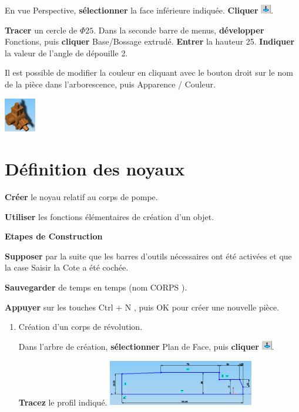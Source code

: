 En vue Perspective, \textbf{sélectionner} la face inférieure indiquée. \textbf{Cliquer} \includegraphics[height=0.4cm]{img/SW-016.png}.
  
\textbf{Tracer} un cercle de $\Phi 25$. 
Dans la seconde barre de menus, \textbf{développer} Fonctions, puis \textbf{cliquer} Base/Bossage extrudé. 
\textbf{Entrer} la hauteur 25. \textbf{Indiquer} la valeur de l'angle de dépouille 2\textdegree. 

 \begin{minipage}{0.7\linewidth}
  Il est possible de modifier la couleur en cliquant avec le bouton droit sur le nom de la pièce dans l'arborescence, puis Apparence / Couleur. 
 \end{minipage}
 \hfill
 \begin{minipage}{0.29\linewidth}
  \centering\centering\includegraphics[height=1.5cm]{img/SW-017.png}
 \end{minipage}

\newpage

\section{Définition des noyaux}

\textbf{Créer} le noyau relatif au corps de pompe.

\textbf{Utiliser} les fonctions élémentaires de création d'un objet. 

\textbf{Etapes de Construction}

\textbf{Supposer} par la suite que les barres d'outils nécessaires ont été activées et que la case \og Saisir la Cote \fg a été cochée. 
 
\textbf{Sauvegarder} de temps en temps (nom CORPS ). 
 
\textbf{Appuyer} sur les touches \og Ctrl + N \fg , puis OK pour créer une nouvelle pièce. 

\begin{enumerate}
 \item Création d'un corps de révolution.

Dans l'arbre de création, \textbf{sélectionner} Plan de Face, puis \textbf{cliquer} \includegraphics[height=0.4cm]{img/SW-018.png}.

\textbf{Tracez} le profil indiqué.
 \includegraphics[height=2cm]{img/SW-019.png}
\end{enumerate}

